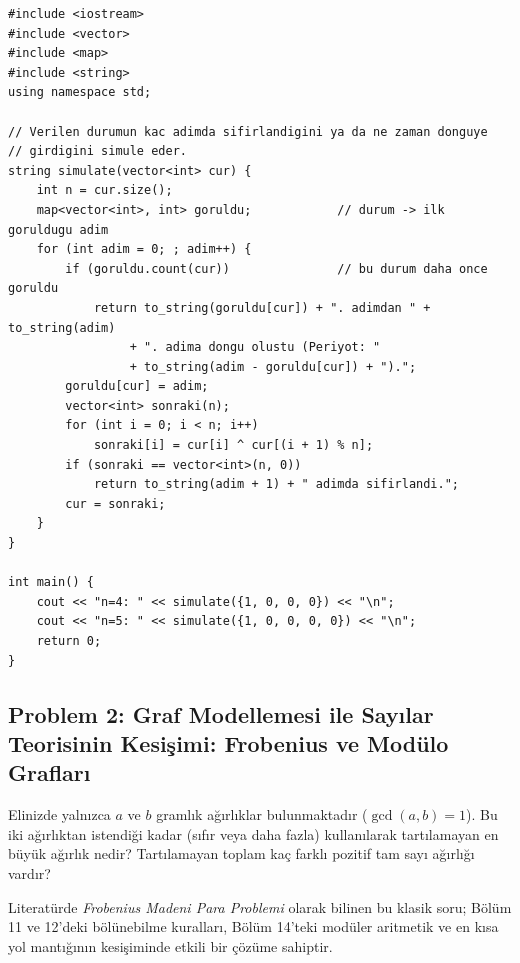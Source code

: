 \begin{lstlisting}[language=CppTemel]
#include <iostream>
#include <vector>
#include <map>
#include <string>
using namespace std;

// Verilen durumun kac adimda sifirlandigini ya da ne zaman donguye
// girdigini simule eder.
string simulate(vector<int> cur) {
    int n = cur.size();
    map<vector<int>, int> goruldu;            // durum -> ilk goruldugu adim
    for (int adim = 0; ; adim++) {
        if (goruldu.count(cur))               // bu durum daha once goruldu
            return to_string(goruldu[cur]) + ". adimdan " + to_string(adim)
                 + ". adima dongu olustu (Periyot: "
                 + to_string(adim - goruldu[cur]) + ").";
        goruldu[cur] = adim;
        vector<int> sonraki(n);
        for (int i = 0; i < n; i++)
            sonraki[i] = cur[i] ^ cur[(i + 1) % n];
        if (sonraki == vector<int>(n, 0))
            return to_string(adim + 1) + " adimda sifirlandi.";
        cur = sonraki;
    }
}

int main() {
    cout << "n=4: " << simulate({1, 0, 0, 0}) << "\n";
    cout << "n=5: " << simulate({1, 0, 0, 0, 0}) << "\n";
    return 0;
}\end{lstlisting}

\subsection{Problem 2: Graf Modellemesi ile Sayılar Teorisinin Kesişimi: Frobenius ve Modülo Grafları}

\begin{example}
Elinizde yalnızca $a$ ve $b$ gramlık ağırlıklar bulunmaktadır ($\gcd(a, b) = 1$). Bu iki ağırlıktan istendiği kadar (sıfır veya daha fazla) kullanılarak tartılamayan en büyük ağırlık nedir? Tartılamayan toplam kaç farklı pozitif tam sayı ağırlığı vardır?
\end{example}

Literatürde \emph{Frobenius Madeni Para Problemi} olarak bilinen bu klasik soru; Bölüm 11 ve 12'deki bölünebilme kuralları, Bölüm 14'teki modüler aritmetik ve en kısa yol mantığının kesişiminde etkili bir çözüme sahiptir.

